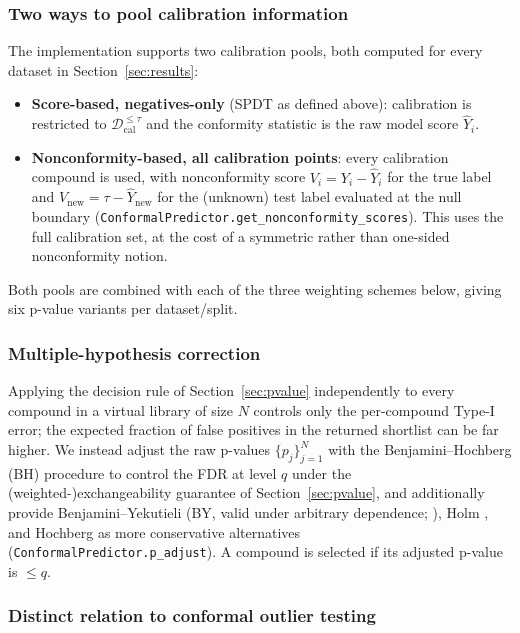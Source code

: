 \documentclass[11pt]{article}
\newcommand{\Dcal}{\mathcal{D}}
\begin{document}
\subsubsection{Two ways to pool calibration information}
\label{sec:pooling}

The implementation supports two calibration pools, both computed for every
dataset in Section~\ref{sec:results}:
\begin{itemize}
    \item \textbf{Score-based, negatives-only} (SPDT as defined above):
    calibration is restricted to $\Dcal_{\mathrm{cal}}^{\le\tau}$ and the
    conformity statistic is the raw model score $\hat Y_i$.
    \item \textbf{Nonconformity-based, all calibration points}: every
    calibration compound is used, with nonconformity score
    $V_i = Y_i - \hat Y_i$ for the true label and
    $V_{\mathrm{new}} = \tau - \hat Y_{\mathrm{new}}$ for the (unknown) test
    label evaluated at the null boundary
    (\texttt{ConformalPredictor.get\_nonconformity\_scores}). This uses the
    full calibration set, at the cost of a symmetric rather than
    one-sided nonconformity notion.
\end{itemize}
Both pools are combined with each of the three weighting schemes below,
giving six p-value variants per dataset/split.

\subsubsection{Multiple-hypothesis correction}

Applying the decision rule of Section~\ref{sec:pvalue} independently to every
compound in a virtual library of size $N$ controls only the per-compound Type-I
error; the expected fraction of false positives in the returned shortlist can
be far higher. We instead adjust the raw p-values $\{p_j\}_{j=1}^N$ with the
Benjamini--Hochberg (BH) procedure \citep{benjamini1995} to control the FDR at
level $q$ under the (weighted-)exchangeability guarantee of
Section~\ref{sec:pvalue}, and additionally provide Benjamini--Yekutieli (BY,
valid under arbitrary dependence; \citealp{benjamini2001}), Holm
\citep{holm1979}, and Hochberg \citep{hochberg1988} as more conservative
alternatives (\texttt{ConformalPredictor.p\_adjust}). A compound is selected
if its adjusted p-value is $\le q$.

\subsubsection{Distinct relation to conformal outlier testing}
\label{sec:spdt-vs-outlier}
\end{document}

